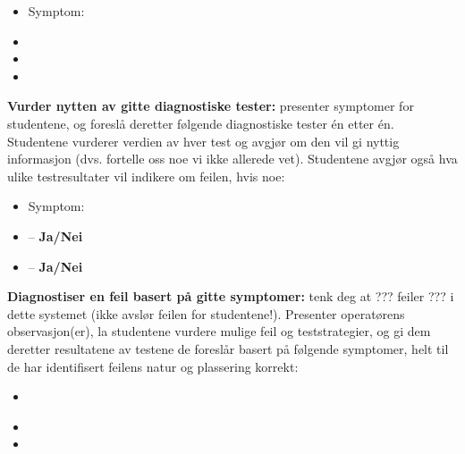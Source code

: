 \begin{itemize}
\item{} Symptom: {\it }
\item{} 
\item{} 
\item{} 
\end{itemize}


\vskip 10pt


\noindent
{\bf Vurder nytten av gitte diagnostiske tester:} presenter symptomer for studentene, og foreslå deretter følgende diagnostiske tester én etter én. Studentene vurderer verdien av hver test og avgjør om den vil gi nyttig informasjon (dvs. fortelle oss noe vi ikke allerede vet). Studentene avgjør også hva ulike testresultater vil indikere om feilen, hvis noe:

\begin{itemize}
\item{} Symptom: {\it }
\item{}  -- {\bf Ja/Nei}
\item{}  -- {\bf Ja/Nei}
\end{itemize}


\vskip 10pt


\noindent
{\bf Diagnostiser en feil basert på gitte symptomer:} tenk deg at ??? feiler ??? i dette systemet (ikke avslør feilen for studentene!). Presenter operatørens observasjon(er), la studentene vurdere mulige feil og teststrategier, og gi dem deretter resultatene av testene de foreslår basert på følgende symptomer, helt til de har identifisert feilens natur og plassering korrekt:

\begin{itemize}
\item{} {\it }
\item{} 
\item{} 
\end{itemize}

